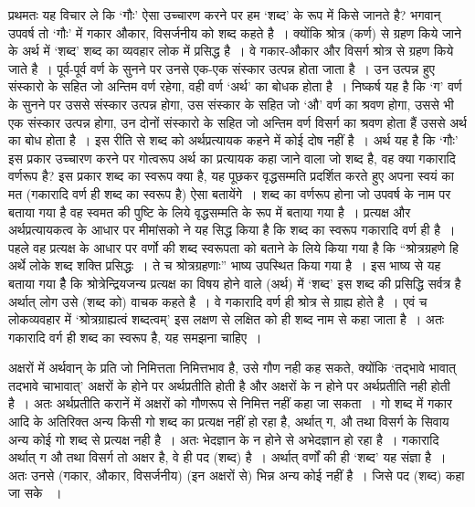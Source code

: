 प्रथमतः यह विचार ले कि ‘गौः' ऐसा उच्चारण करने पर हम ‘शब्द' के रूप में किसे जानते है? भगवान् उपवर्ष तो ‘गौः' में गकार औकार, विसर्जनीय को शब्द कहते है~। क्योंकि श्रोत्र (कर्ण) से ग्रहण किये जाने के अर्थ में ‘शब्द' शब्द का व्यवहार लोक में प्रसिद्ध है~। वे गकार-औकार और विसर्ग श्रोत्र से ग्रहण किये जाते है~। पूर्व-पूर्व वर्ण के सुनने पर उनसे एक-एक संस्कार उत्पन्न होता जाता है~। उन उत्पन्न हुए संस्कारो के सहित जो अन्तिम वर्ण रहेगा, वही वर्ण ‘अर्थ' का बोधक होता है~। निष्कर्ष यह है कि ‘ग' वर्ण के सुनने पर उससे संस्कार उत्पन्न होगा, उस संस्कार के सहित जो ‘औ' वर्ण का श्रवण होगा, उससे भी एक संस्कार उत्पन्न होगा, उन दोनों संस्कारो के सहित जो अन्तिम वर्ण विसर्ग का श्रवण होता हैं उससे अर्थ का बोध होता है~। इस रीति से शब्द को अर्थप्रत्यायक कहने में कोई दोष नहीं है~। अर्थ यह है कि ‘गौः' इस प्रकार उच्चारण करने पर गोत्वरूप अर्थ का प्रत्यायक कहा जाने वाला जो शब्द है, वह क्या गकारादि वर्णरूप है? इस प्रकार शब्द का स्वरूप क्या है, यह पूछकर वृद्धसम्मति प्रदर्शित करते हुए अपना स्वयं का मत (गकारादि वर्ण ही शब्द का स्वरूप है) ऐसा बतायेंगे~। शब्द का वर्णरूप होना जो उपवर्ष के नाम पर बताया गया है वह स्वमत की पुष्टि के लिये वृद्धसम्मति के रूप में बताया गया है~। प्रत्यक्ष और अर्थप्रत्यायकत्व के आधार पर मीमांसको ने यह सिद्ध किया है कि शब्द का स्वरूप गकारादि वर्ण ही है~। पहले वह प्रत्यक्ष के आधार पर वर्णो की शब्द स्वरूपता को बताने के लिये किया गया है कि “श्रोत्रग्रहणे हि अर्थे लोके शब्द शक्ति प्रसिद्धः~। ते च श्रोत्रग्रहणाः” भाष्य उपस्थित किया गया है~। इस भाष्य से यह बताया गया हैै कि श्रोत्रेन्द्रियजन्य प्रत्यक्ष का विषय होने वाले (अर्थ) में ‘शब्द' इस शब्द की प्रसिद्धि सर्वत्र है अर्थात् लोग उसे (शब्द को) वाचक कहते है~। वे गकारादि वर्ण ही श्रोत्र से ग्राह्य होते है~। एवं च लोकव्यवहार में ‘श्रोत्रग्राह्यत्वं शब्दत्वम्' इस लक्षण से लक्षित को ही शब्द नाम से कहा जाता है~। अतः गकारादि वर्ग ही शब्द का स्वरूप है, यह समझना चाहिए~। 

अक्षरों में अर्थवान् के प्रति जो निमित्तता निमित्तभाव है, उसे गौण नही कह सकते, क्योंकि ‘तद्भावे भावात् तदभावे चाभावात्' अक्षरों के होने पर अर्थप्रतीति होती है और अक्षरों के न होने पर अर्थप्रतीति नही होती है~। अतः अर्थप्रतीति करानें में अक्षरों को गौणरूप से निमित्त नहीं कहा जा सकता~। गो शब्द में गकार आदि के अतिरिक्त अन्य किसी गो शब्द का प्रत्यक्ष नहीं हो रहा है, अर्थात् ग, औ तथा विसर्ग के सिवाय अन्य कोई गो शब्द से प्रत्यक्ष नही है~। अतः भेदज्ञान के न होने से अभेदज्ञान हो रहा है~। गकारादि अर्थात् ग औ तथा विसर्ग तो अक्षर है, वे ही पद (शब्द) है~। अर्थात् वर्णों की ही ‘शब्द' यह संज्ञा है~। अतः उनसे (गकार, औकार, विसर्जनीय) (इन अक्षरों से) भिन्न अन्य कोई नहीं है~। जिसे पद (शब्द) कहा जा सके ~। 

